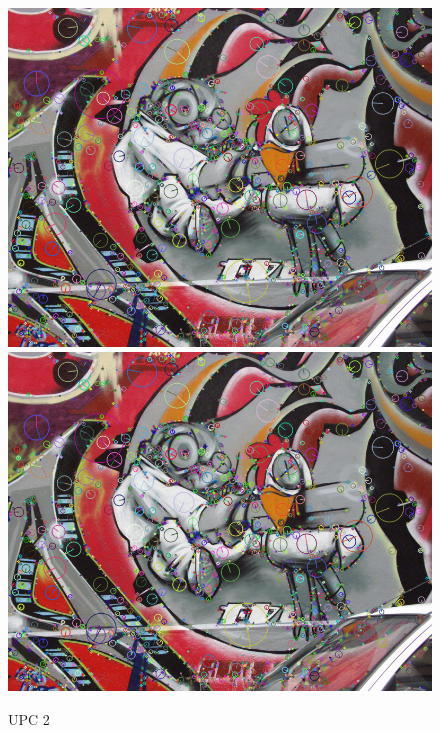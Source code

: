 		\begin{figure}[!htb]
				\includegraphics[width=\linewidth]{images/RobotKp}
				\label{fig:awesome_image1}
			\endminipage\hfill
				\includegraphics[width=\linewidth]{images/RobotKp}
				\label{fig:awesome_image2}
			\endminipage
			\caption{UPC 2}
		\end{figure}


